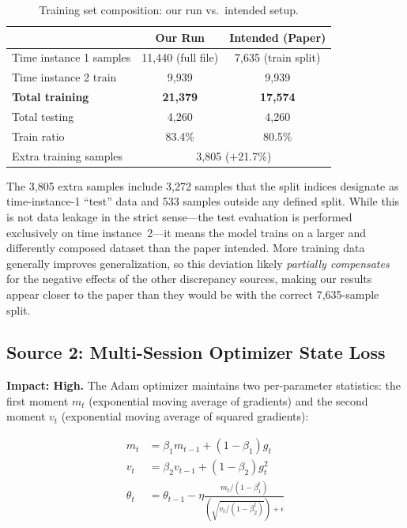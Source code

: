 \documentclass[12pt,a4paper]{article}
\begin{document}
\begin{table}[H]
\centering
\caption{Training set composition: our run vs.\ intended setup.}
\label{tab:data_discrepancy}
\begin{tabular}{@{}lcc@{}}
\toprule
& \textbf{Our Run} & \textbf{Intended (Paper)} \\
\midrule
Time instance 1 samples     & 11{,}440 (full file)     & 7{,}635 (train split) \\
Time instance 2 train       & 9{,}939                  & 9{,}939 \\
\textbf{Total training}     & \textbf{21{,}379}        & \textbf{17{,}574} \\
Total testing               & 4{,}260                  & 4{,}260 \\
Train ratio                 & 83.4\%                   & 80.5\% \\
Extra training samples      & \multicolumn{2}{c}{3{,}805 ($+$21.7\%)} \\
\bottomrule
\end{tabular}
\end{table}

The 3{,}805 extra samples include 3{,}272 samples that the split indices designate as time-instance-1 ``test'' data and 533 samples outside any defined split. While this is not data leakage in the strict sense---the test evaluation is performed exclusively on time instance~2---it means the model trains on a larger and differently composed dataset than the paper intended. More training data generally improves generalization, so this deviation likely \emph{partially compensates} for the negative effects of the other discrepancy sources, making our results appear closer to the paper than they would be with the correct 7{,}635-sample split.

\subsection{Source 2: Multi-Session Optimizer State Loss}

\textbf{Impact: High.} The Adam optimizer maintains two per-parameter statistics: the first moment $m_t$ (exponential moving average of gradients) and the second moment $v_t$ (exponential moving average of squared gradients):

\begin{align}
    m_t &= \beta_1 m_{t-1} + (1 - \beta_1) g_t \\
    v_t &= \beta_2 v_{t-1} + (1 - \beta_2) g_t^2 \\
    \theta_t &= \theta_{t-1} - \eta \frac{m_t / (1 - \beta_1^t)}{(\sqrt{v_t / (1 - \beta_2^t)}) + \epsilon}
\end{align}
\end{document}
